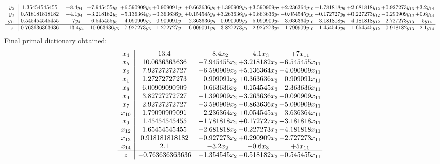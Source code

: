 \documentclass[11pt]{article}
\begin{document}
\[\begin{array}{c| c c@{\hskip 2pt} c@{\hskip 2pt} c@{\hskip 2pt} c@{\hskip 2pt} c@{\hskip 2pt} c@{\hskip 2pt} c@{\hskip 2pt} c@{\hskip 2pt} c@{\hskip 2pt} c@{\hskip 2pt} c@{\hskip 2pt} c@{\hskip 2pt} }
 y_{2}   &  1.35454545455 & + 8.4 y_{4} & + 7.945455 y_{5} & + 6.590909 y_{6} & + 0.909091 y_{1} & + 0.663636 y_{8} & + 1.390909 y_{9} & + 3.590909 y_{7} & + 2.236364 y_{10} & + 1.781818 y_{9} & + 2.681818 y_{12} & + 0.927273 y_{13} & + 3.2 y_{14}\\
 y_{3}   &  0.518181818182 & -4.1 y_{4} & -3.218182 y_{5} & -5.136364 y_{6} & -0.363636 y_{1} & + 0.154545 y_{8} & + 3.263636 y_{9} & + 0.863636 y_{7} & -0.054545 y_{10} & -0.172727 y_{9} & + 0.227273 y_{12} & -0.290909 y_{13} & + 0.6 y_{14}\\
 y_{11}   &  0.545454545455 & -7 y_{4} & -6.545455 y_{5} & -4.090909 y_{6} & -0.909091 y_{1} & -2.363636 y_{8} & -0.090909 y_{9} & -5.090909 y_{7} & -3.636364 y_{10} & -3.181818 y_{9} & -4.181818 y_{12} & -2.727273 y_{13} & -5 y_{14}\\
\hline
z    &  0.763636363636 & -13.4 y_{4} & -10.063636 y_{5} & -7.927273 y_{6} & -1.272727 y_{1} & -6.009091 y_{8} & -3.827273 y_{9} & -2.927273 y_{7} & -1.790909 y_{10} & -1.454545 y_{9} & -1.654545 y_{12} & -0.918182 y_{13} & -2.1 y_{14}\\
\end{array}\]
 Final primal dictionary obtained: 
\[\begin{array}{c| c c@{\hskip 2pt} c@{\hskip 2pt} c@{\hskip 2pt} }
 x_{4}   &  13.4 & -8.4 x_{2} & + 4.1 x_{3} & + 7 x_{11}\\
 x_{5}   &  10.0636363636 & -7.945455 x_{2} & + 3.218182 x_{3} & + 6.545455 x_{11}\\
 x_{6}   &  7.92727272727 & -6.590909 x_{2} & + 5.136364 x_{3} & + 4.090909 x_{11}\\
 x_{1}   &  1.27272727273 & -0.909091 x_{2} & + 0.363636 x_{3} & + 0.909091 x_{11}\\
 x_{8}   &  6.00909090909 & -0.663636 x_{2} & -0.154545 x_{3} & + 2.363636 x_{11}\\
 x_{9}   &  3.82727272727 & -1.390909 x_{2} & -3.263636 x_{3} & + 0.090909 x_{11}\\
 x_{7}   &  2.92727272727 & -3.590909 x_{2} & -0.863636 x_{3} & + 5.090909 x_{11}\\
 x_{10}   &  1.79090909091 & -2.236364 x_{2} & + 0.054545 x_{3} & + 3.636364 x_{11}\\
 x_{9}   &  1.45454545455 & -1.781818 x_{2} & + 0.172727 x_{3} & + 3.181818 x_{11}\\
 x_{12}   &  1.65454545455 & -2.681818 x_{2} & -0.227273 x_{3} & + 4.181818 x_{11}\\
 x_{13}   &  0.918181818182 & -0.927273 x_{2} & + 0.290909 x_{3} & + 2.727273 x_{11}\\
 x_{14}   &  2.1 & -3.2 x_{2} & -0.6 x_{3} & + 5 x_{11}\\
\hline
z    &  -0.763636363636 & -1.354545 x_{2} & -0.518182 x_{3} & -0.545455 x_{11}\\
\end{array}\]
\end{document}
